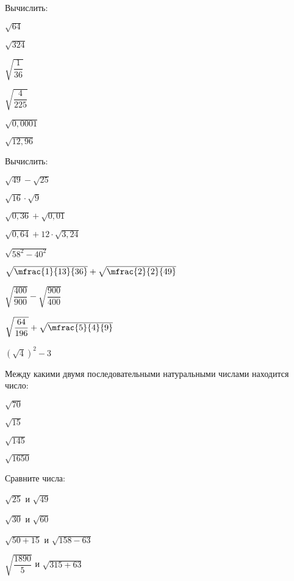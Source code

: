 %
%
\begin{homework}[number=1]
	\begin{listofex}
		\item Вычислить:
		\begin{enumcols}[itemcolumns=2]
			\item \( \sqrt{64} \)
			\item \( \sqrt{324} \)
			\item \( \sqrt{\dfrac{1}{36}} \)
			\item \( \sqrt{\dfrac{4}{225}} \)
			\item \( \sqrt{0,0001} \)
			\item \( \sqrt{12,96} \)
		\end{enumcols}
		\item Вычислить:
		\begin{enumcols}[itemcolumns=2]
			\item \( \sqrt{49}-\sqrt{25} \)
			\item \( \sqrt{16}\cdot\sqrt{9} \)
			\item \( \sqrt{0,36}+\sqrt{0,01} \)
			\item \( \sqrt{0,64}+12\cdot\sqrt{3,24} \)
			\item \( \sqrt{58^2-40^2} \)
			\item \( \sqrt{\mfrac{1}{13}{36}}+\sqrt{\mfrac{2}{2}{49}} \)
			\item \( \sqrt{\dfrac{400}{900}}-\sqrt{\dfrac{900}{400}} \)
			\item \( \sqrt{\dfrac{64}{196}}+\sqrt{\mfrac{5}{4}{9}} \)
			\item \( (\sqrt{4})^2-3 \)
		\end{enumcols}
		\item Между какими двумя последовательными натуральными числами находится число:
		\begin{enumcols}[itemcolumns=4]
			\item \( \sqrt{70} \)
			\item \( \sqrt{15} \)
			\item \( \sqrt{145} \)
			\item \( \sqrt{1650} \)
		\end{enumcols}
		\item Сравните числа:
		\begin{enumcols}[itemcolumns=2]
			\item \( \sqrt{25} \) и \( \sqrt{49} \)
			\item \( \sqrt{30} \) и \( \sqrt{60} \)
			\item \( \sqrt{50+15} \) и \( \sqrt{158-63} \)
			\item \( \sqrt{\dfrac{1890}{5}} \) и \( \sqrt{315+63} \)
		\end{enumcols}
	\end{listofex}
\end{homework}
